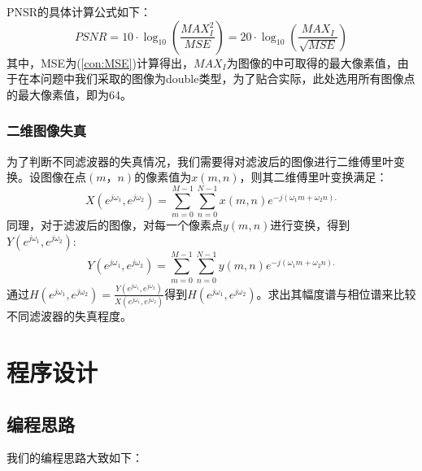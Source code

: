 \documentclass{article}
\begin{document}
PNSR的具体计算公式如下：
\begin{equation}
P S N R=10 \cdot \log _{10}\left(\frac{M A X_I^2}{M S E}\right)=20 \cdot \log _{10}\left(\frac{M A X_I}{\sqrt{M S E}}\right)
\end{equation}
其中，MSE为(\ref{con:MSE})计算得出，$M A X_I$为图像的中可取得的最大像素值，由于在本问题中我们采取的图像为double类型，为了贴合实际，此处选用所有图像点的最大像素值，即为64。
\subsubsection{二维图像失真}
为了判断不同滤波器的失真情况，我们需要得对滤波后的图像进行二维傅里叶变换。设图像在点$(m，n)$的像素值为$x(m,n)$，则其二维傅里叶变换满足：
\begin{equation}
X(e^{j\omega_1}, e^{j\omega_2})=\sum_{m=0}^{M-1} \sum_{n=0}^{N-1} x(m, n) e^{-j \left(\omega_1m+\omega_2n\right).}
\end{equation}
同理，对于滤波后的图像，对每一个像素点$y(m,n)$进行变换，得到$Y(e^{j\omega_1}, e^{j\omega_2})$:
\begin{equation}
Y(e^{j\omega_1}, e^{j\omega_2})=\sum_{m=0}^{M-1} \sum_{n=0}^{N-1} y(m, n) e^{-j \left(\omega_1m+\omega_2n\right).}
\end{equation}
通过$H(e^{j\omega_1},e^{j\omega_2})=\frac{Y(e^{j\omega_1}, e^{j\omega_2})}{X(e^{j\omega_1}, e^{j\omega_2})}$得到$H(e^{j\omega_1},e^{j\omega_2})$。求出其幅度谱与相位谱来比较不同滤波器的失真程度。
\section{程序设计}
\subsection{编程思路}
我们的编程思路大致如下：
\end{document}
